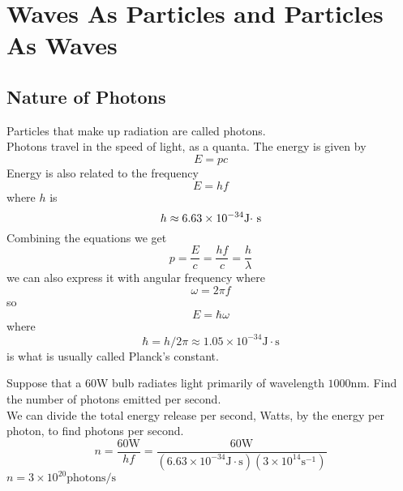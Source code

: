 \chapter{Waves As Particles and Particles As Waves}
\section{Nature of Photons}
Particles that make up radiation are called photons. \\
Photons travel in the speed of light, as a quanta. The energy is given by
\[ E = pc \]
Energy is also related to the frequency
\[ E = hf \]
where $ h $ is 
\[ h \approx 6.63 \times 10^{-34} \mbox{J$ \cdot $ s} \]
Combining the equations we get
\[ p = \frac { E } { c } = \frac { h f } { c } = \frac { h } { \lambda } \]
we can also express it with angular frequency where \[ \omega = 2 \pi f \]
so
\[ E = \hbar \omega \]
where
\[ \hbar = h / 2 \pi \approx 1.05 \times 10 ^ { - 34 } \mathrm { J } \cdot \mathrm { s } \]
is what is usually called Planck's constant. 
\begin{example}
	Suppose that a $ 60 $W bulb radiates light primarily of wavelength $ 1000 $nm. Find the number of photons emitted per second. \\
	We can divide the total energy release per second, Watts, by the energy per photon, to find photons per second.
	\[ n = \frac { 60 \mathrm { W } } { h f } = \frac { 60 \mathrm { W } } { \left( 6.63 \times 10 ^ { - 34 } \mathrm { J } \cdot \mathrm { s } \right) \left( 3 \times 10 ^ { 14 } \mathrm { s } ^ { - 1 } \right) } \]
	$ n  = 3 \times 10 ^ { 20 } \mathrm { photons } / \mathrm { s }$
\end{example}
